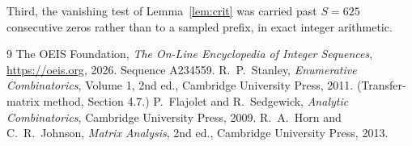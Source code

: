 \documentclass[11pt,a4paper]{article}
\theoremstyle{plain}
\theoremstyle{definition}
\begin{document}
Third, the vanishing test of Lemma~\ref{lem:crit} was carried past $S=625$ consecutive
zeros rather than to a sampled prefix, in exact integer arithmetic.

\begin{thebibliography}{9}
 The OEIS Foundation, \emph{The On-Line Encyclopedia of Integer
Sequences}, \url{https://oeis.org}, 2026. Sequence A234559.
 R.~P.~Stanley, \emph{Enumerative Combinatorics}, Volume 1, 2nd ed.,
Cambridge University Press, 2011. (Transfer-matrix method, Section 4.7.)
 P.~Flajolet and R.~Sedgewick, \emph{Analytic Combinatorics}, Cambridge
University Press, 2009.
 R.~A.~Horn and C.~R.~Johnson, \emph{Matrix Analysis}, 2nd ed., Cambridge
University Press, 2013.
\end{thebibliography}
\end{document}
